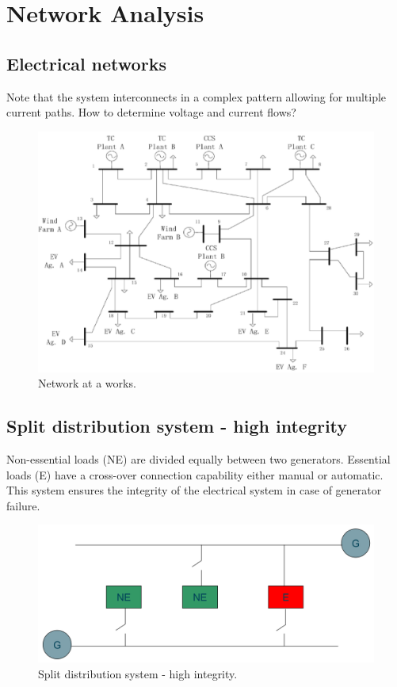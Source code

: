 \chapter{Network Analysis}
\section{Electrical networks}
Note that the system interconnects in a complex pattern allowing for multiple current paths. How to determine voltage and current flows?
\begin{figure}[H]
	\centering
	\includegraphics[width = \textwidth]{./img/figure45.png}
	\caption{Network at a works.}
\end{figure}
\section{Split distribution system - high integrity}
Non-essential loads (NE) are divided equally between two generators. Essential loads (E) have a cross-over connection capability either manual or automatic. This system ensures the integrity of the electrical system in case of generator failure.
\begin{figure}[H]
	\centering
	\includegraphics[width = \textwidth]{./img/figure46.png}
	\caption{Split distribution system - high integrity.}
\end{figure}
